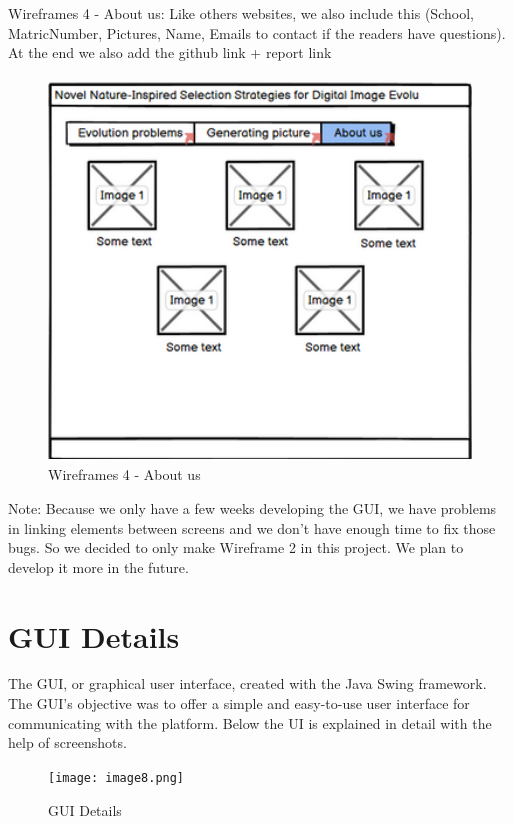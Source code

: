 Wireframes 4 - About us: Like others websites, we also include this (School, MatricNumber, Pictures, Name, Emails to contact if the readers have questions). At the end we also add the github link + report link
\begin{figure}
\centering
\includegraphics[width=5in,height=4in]{images/wf4.png}
\caption{Wireframes 4 - About us}
\end{figure}

Note: Because we only have a few weeks developing the GUI, we have problems in linking elements between screens and we don't have enough time to fix those bugs. So we decided to only make Wireframe 2 in this project. We plan to develop it more in the future.
\clearpage


\section{GUI Details}
\label{gui-details}

The GUI, or graphical user interface, created with the Java Swing framework. The GUI's objective was to offer a simple and easy-to-use user interface for communicating with the  platform.
Below the UI is explained in detail with the help of screenshots.

\begin{figure}
\centering
\texttt{[image: image8.png]}
\caption{GUI Details}
\end{figure}
\newpage

